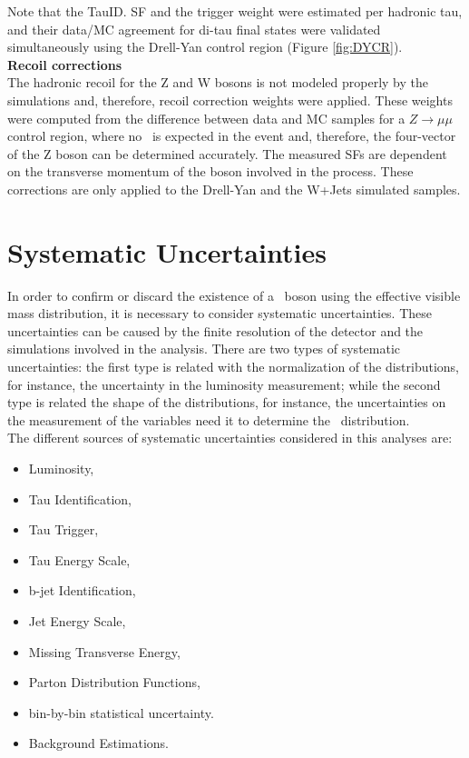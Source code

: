 \noindent Note that the TauID. SF and the trigger weight were 
estimated per hadronic tau, and their data/MC agreement
for di-tau final states were validated simultaneously 
using the Drell-Yan control region (Figure \ref{fig:DYCR}).\\

\textbf{Recoil corrections} \\

\noindent The hadronic recoil for the Z and W bosons is not modeled properly
by the simulations and, therefore, recoil correction weights were applied. These
weights were computed from the difference between data and MC samples for a 
$Z\rightarrow\mu\mu$ control region, where no \MET~is expected 
in the event and, therefore, the four-vector of the Z boson can be 
determined accurately. The measured SFs are dependent on the 
transverse momentum of the boson involved in the process. These corrections
are only applied to the Drell-Yan and the W+Jets simulated samples.



\section{Systematic Uncertainties}
\label{sec:Systematics}

In order to confirm or discard the existence of a \Zprime~boson using 
the effective visible mass distribution, it is necessary 
to consider systematic uncertainties. These uncertainties can be 
caused by the finite resolution of the detector and the 
simulations involved in the analysis. There are two types of 
systematic uncertainties: the first type is related with the 
normalization of the distributions, for instance, the uncertainty 
in the luminosity measurement; while the second type is related 
the shape of the distributions, for instance, the uncertainties on 
the measurement of the variables need it to determine 
the \mass~distribution. \\


\noindent The different sources of systematic uncertainties considered
in this analyses are:

\begin{itemize}
 \item Luminosity,
 \item Tau Identification,
 \item Tau Trigger,
 \item Tau Energy Scale,
 \item b-jet Identification,
 \item Jet Energy Scale,
 \item Missing Transverse Energy,
 \item Parton Distribution Functions,
 \item bin-by-bin statistical uncertainty.
 \item Background Estimations.
\end{itemize}

